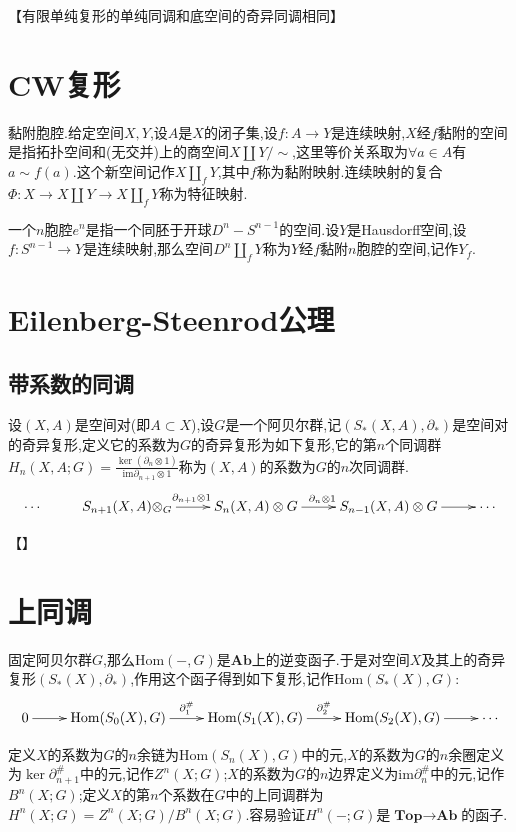 【有限单纯复形的单纯同调和底空间的奇异同调相同】

\newpage
\section{CW复形}

黏附胞腔.给定空间$X,Y$,设$A$是$X$的闭子集,设$f:A\to Y$是连续映射,$X$经$f$黏附的空间是指拓扑空间和(无交并)上的商空间$X\coprod Y/\sim$,这里等价关系取为$\forall a\in A$有$a\sim f(a)$.这个新空间记作$X\coprod_fY$,其中$f$称为黏附映射.连续映射的复合$\Phi:X\to X\coprod Y\to X\coprod_fY$称为特征映射.

一个$n$胞腔$e^n$是指一个同胚于开球$D^n-S^{n-1}$的空间.设$Y$是Hausdorff空间,设$f:S^{n-1}\to Y$是连续映射,那么空间$D^n\coprod_fY$称为$Y$经$f$黏附$n$胞腔的空间,记作$Y_f$.


\newpage
\section{Eilenberg-Steenrod公理}


\subsection{带系数的同调}

设$(X,A)$是空间对(即$A\subset X$),设$G$是一个阿贝尔群,记$(S_*(X,A),\partial_*)$是空间对的奇异复形,定义它的系数为$G$的奇异复形为如下复形,它的第$n$个同调群$H_n(X,A;G)=\frac{\ker(\partial_n\otimes1)}{\mathrm{im}\partial_{n+1}\otimes1}$称为$(X,A)$的系数为$G$的$n$次同调群.
$$\xymatrix{\cdots&S_{n+1}(X,A)\otimes_G\ar[r]^{\partial_{n+1}\otimes1}&S_n(X,A)\otimes G\ar[r]^{\partial_n\otimes1}&S_{n-1}(X,A)\otimes G\ar[r]&\cdots}$$

【】



\newpage
\section{上同调}

固定阿贝尔群$G$,那么$\mathrm{Hom}(-,G)$是$\textbf{Ab}$上的逆变函子.于是对空间$X$及其上的奇异复形$(S_*(X),\partial_*)$,作用这个函子得到如下复形,记作$\mathrm{Hom}(S_*(X),G)$:
$$\xymatrix{0\ar[r]&\mathrm{Hom}(S_0(X),G)\ar[r]^{\partial_1^{\#}}&\mathrm{Hom}(S_1(X),G)\ar[r]^{\partial_2^{\#}}&\mathrm{Hom}(S_2(X),G)\ar[r]&\cdots}$$

定义$X$的系数为$G$的$n$余链为$\mathrm{Hom}(S_n(X),G)$中的元,$X$的系数为$G$的$n$余圈定义为$\ker\partial_{n+1}^{\#}$中的元,记作$Z^n(X;G)$;$X$的系数为$G$的$n$边界定义为$\mathrm{im}\partial_n^{\#}$中的元,记作$B^n(X;G)$;定义$X$的第$n$个系数在$G$中的上同调群为$H^n(X;G)=Z^n(X;G)/B^n(X;G)$.容易验证$H^n(-;G)$是$\textbf{Top}\to\textbf{Ab}$的函子.

